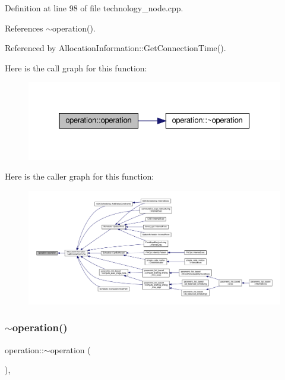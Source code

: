 Definition at line 98 of file technology\+\_\+node.\+cpp.



References $\sim$operation().



Referenced by Allocation\+Information\+::\+Get\+Connection\+Time().

Here is the call graph for this function\+:
\nopagebreak
\begin{figure}[H]
\begin{center}
\leavevmode
\includegraphics[width=326pt]{d9/dc0/structoperation_ad4625adf0914d5c4dd25b1710703b642_cgraph}
\end{center}
\end{figure}
Here is the caller graph for this function\+:
\nopagebreak
\begin{figure}[H]
\begin{center}
\leavevmode
\includegraphics[width=350pt]{d9/dc0/structoperation_ad4625adf0914d5c4dd25b1710703b642_icgraph}
\end{center}
\end{figure}
\mbox{\label{structoperation_aa513f0c61b49ef30a3a8b49fc3eb5874}} 
\subsubsection{\texorpdfstring{$\sim$operation()}{~operation()}}
{\footnotesize\ttfamily operation\+::$\sim$operation (\begin{DoxyParamCaption}{ }\end{DoxyParamCaption})\hspace{0.3cm}{\ttfamily [override]}, {\ttfamily [default]}}



